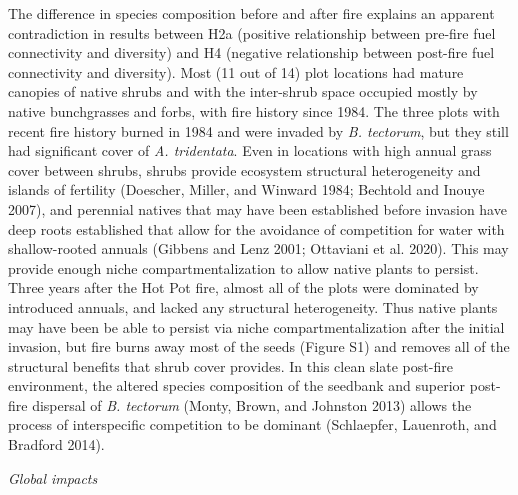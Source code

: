 \documentclass[
  12pt,
]{article}
\begin{document}
The difference in species composition before and after fire explains an
apparent contradiction in results between H2a (positive relationship
between pre-fire fuel connectivity and diversity) and H4 (negative
relationship between post-fire fuel connectivity and diversity). Most
(11 out of 14) plot locations had mature canopies of native shrubs and
with the inter-shrub space occupied mostly by native bunchgrasses and
forbs, with fire history since 1984. The three plots with recent fire
history burned in 1984 and were invaded by \emph{B. tectorum}, but they
still had significant cover of \emph{A. tridentata}. Even in locations
with high annual grass cover between shrubs, shrubs provide ecosystem
structural heterogeneity and islands of fertility (Doescher, Miller, and
Winward 1984; Bechtold and Inouye 2007), and perennial natives that may
have been established before invasion have deep roots established that
allow for the avoidance of competition for water with shallow-rooted
annuals (Gibbens and Lenz 2001; Ottaviani et al. 2020). This may provide
enough niche compartmentalization to allow native plants to persist.
Three years after the Hot Pot fire, almost all of the plots were
dominated by introduced annuals, and lacked any structural
heterogeneity. Thus native plants may have been be able to persist via
niche compartmentalization after the initial invasion, but fire burns
away most of the seeds (Figure S1) and removes all of the structural
benefits that shrub cover provides. In this clean slate post-fire
environment, the altered species composition of the seedbank and
superior post-fire dispersal of \emph{B. tectorum} (Monty, Brown, and
Johnston 2013) allows the process of interspecific competition to be
dominant (Schlaepfer, Lauenroth, and Bradford 2014).

\emph{Global impacts}
\end{document}
